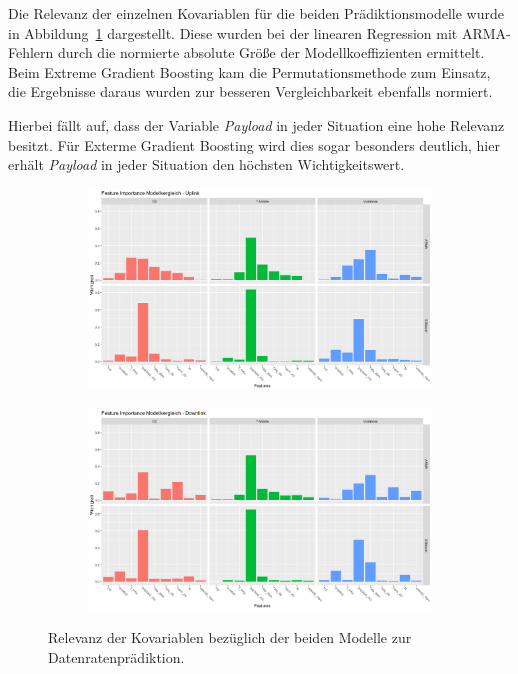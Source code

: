 Die Relevanz der einzelnen Kovariablen f\"ur die beiden Pr\"adiktionsmodelle wurde in Abbildung~\ref{fig:feature-importance-datenraten}
dargestellt.
Diese wurden bei der linearen Regression mit ARMA-Fehlern durch die normierte absolute Gr\"o{\ss}e der Modellkoeffizienten ermittelt.
Beim Extreme Gradient Boosting kam die Permutationsmethode zum Einsatz, die Ergebnisse daraus wurden zur besseren Vergleichbarkeit
ebenfalls normiert.

Hierbei f\"allt auf, dass der Variable \textit{Payload} in jeder Situation eine hohe Relevanz besitzt.
F\"ur Exterme Gradient Boosting wird dies sogar besonders deutlich, hier erh\"alt \textit{Payload} in jeder Situation den h\"ochsten
Wichtigkeitswert.
\begin{figure}
\centering
\begin{subfigure}{\textwidth}
    \centering
    \includegraphics[width=\textwidth]{abbildungen/feature_importance_modellvergleich_uplink}
\end{subfigure}
\begin{subfigure}{\textwidth}
    \centering
    \includegraphics[width=\textwidth]{abbildungen/feature_importance_modellvergleich_downlink}
\end{subfigure}
\caption{Relevanz der Kovariablen bez\"uglich der beiden Modelle zur Datenratenpr\"adiktion.}
\label{fig:feature-importance-datenraten}
\end{figure}

